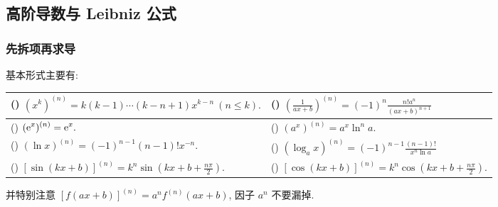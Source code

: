 \subsection{高阶导数与 Leibniz 公式}

\subsubsection{先拆项再求导}


基本形式主要有:

\setcounter{magicrownumbers}{0}
\begin{table}[H]
    \centering
    \begin{tabular}{l l}
        (\rownumber{}) $\displaystyle (x^k)^{(n)}=k(k-1)\cdots(k-n+1)x^{k-n}~  (n\leqslant k).$    & (\rownumber{}) $\displaystyle \left(\frac{1}{ax+b}\right)^{(n)}=(-1)^n\frac{n!a^n}{(ax+b)^{n+1}}$ \\
        \midrule
        (\rownumber{}) $\displaystyle(\mathrm{e} ^x)^{(n)}=\mathrm{e} ^x.$                                         & (\rownumber{}) $\displaystyle (a^x)^{(n)}=a^x\ln^n a.$                                            \\
        (\rownumber{}) $\displaystyle(\ln x)^{(n)}=(-1)^{n-1}(n-1)!x^{-n}.$                        & (\rownumber{}) $\displaystyle(\log_ax)^{(n)}=(-1)^{n-1}\frac{(n-1)!}{x^n\ln a}$                   \\
        \midrule
        (\rownumber{}) $\displaystyle[\sin (kx+b)]^{(n)}=k^n\sin\left(kx+b+\frac{n\pi}{2}\right).$ & (\rownumber{}) $\displaystyle[\cos (kx+b)]^{(n)}=k^n\cos\left(kx+b+\frac{n\pi}{2}\right).$
    \end{tabular}
\end{table}
并特别注意 $[f(ax+b)]^{(n)}=a^nf^{(n)}(ax+b)$, 因子 $a^n$ 不要漏掉.

